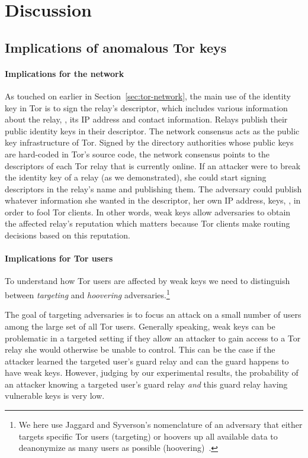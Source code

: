 \section{Discussion}
\label{sec:discussion}
\subsection{Implications of anomalous Tor keys}
\paragraph{Implications for the network}
As touched on earlier in Section~\ref{sec:tor-network}, the main use of the
identity key in Tor is to sign the relay's descriptor, which includes various
information about the relay, \eg, its IP address and contact information.
Relays publish their public identity keys in their descriptor.  The network
consensus acts as the public key infrastructure of Tor.  Signed by the directory
authorities whose public keys are hard-coded in Tor's source code, the network
consensus points to the descriptors of each Tor relay that is currently online.
If an attacker were to break the identity key of a relay (as we demonstrated),
she could start signing descriptors in the relay's name and publishing them. The
adversary could publish whatever information she wanted in the descriptor, \eg
her own IP address, keys, \etc, in order to fool Tor clients.  In other words,
weak keys allow adversaries to obtain the affected relay's reputation which
matters because Tor clients make routing decisions based on this reputation.

\paragraph{Implications for Tor users}
To understand how Tor users are affected by weak keys we need to distinguish
between \emph{targeting} and \emph{hoovering} adversaries.\footnote{We here use
Jaggard and Syverson's nomenclature of an adversary that either targets
specific Tor users (targeting) or hoovers up all available data to
deanonymize as many users as possible (hoovering)~\cite{Jaggard2017a}.}

The goal of targeting adversaries is to focus an attack on a small number of
users among the large set of all Tor users.  Generally speaking, weak keys can
be problematic in a targeted setting if they allow an attacker to gain access to
a Tor relay she would otherwise be unable to control.  This can be the case if
the attacker learned the targeted user's guard relay and can the guard happens
to have weak keys.  However, judging by our experimental results, the
probability of an attacker knowing a targeted user's guard relay \emph{and} this
guard relay having vulnerable keys is very low.

